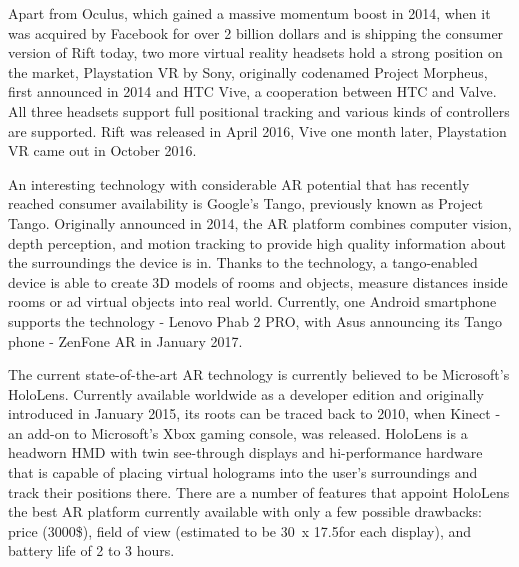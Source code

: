 \documentclass[12pt, a4paper]{article}
\begin{document}
Apart from Oculus, which gained a massive momentum boost in 2014, when it was acquired by Facebook for over 2 billion dollars and is shipping the consumer version of Rift today, two more virtual reality headsets hold a strong position on the market, Playstation VR by Sony, originally codenamed Project Morpheus, first announced in 2014 and HTC Vive, a cooperation between HTC and Valve. All three headsets support full positional tracking and various kinds of controllers are supported. Rift was released in April 2016, Vive one month later, Playstation VR came out in October 2016.

An interesting technology with considerable AR potential that has recently reached consumer availability is Google’s Tango, previously known as Project Tango. Originally announced in 2014, the AR platform combines computer vision, depth perception, and motion tracking to provide high quality information about the surroundings the device is in. Thanks to the technology, a tango-enabled device is able to create 3D models of rooms and objects, measure distances inside rooms or ad virtual objects into real world. Currently, one Android smartphone supports the technology - Lenovo Phab 2 PRO, with Asus announcing its Tango phone - ZenFone AR in January 2017.

The current state-of-the-art AR technology is currently believed to be Microsoft’s HoloLens. Currently available worldwide as a developer edition and originally introduced in January 2015, its roots can be traced back to 2010, when Kinect - an add-on to Microsoft’s Xbox gaming console, was released. HoloLens is a headworn HMD with twin see-through displays and hi-performance hardware that is capable of placing virtual holograms into the user’s surroundings and track their positions there. There are a number of features that appoint HoloLens the best AR platform currently available with only a few possible drawbacks: price (3000\$), field of view (estimated to be 30\degree~x 17.5\degree for each display), and battery life of 2 to 3 hours. 
\end{document}
